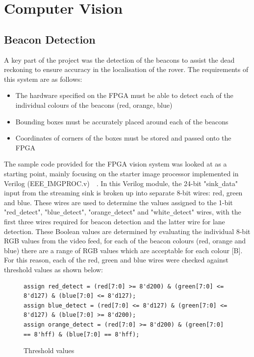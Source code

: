 \section{Computer Vision}
\subsection{Beacon Detection}
A key part of the project was the detection of the beacons to assist the dead reckoning to ensure accuracy in the localisation of the rover.
The requirements of this system are as follows:

\begin{itemize}
    \item The hardware specified on the FPGA must be able to detect each of the individual colours of the beacons (red, orange, blue)
    \item Bounding boxes must be accurately placed around each of the beacons
    \item Coordinates of corners of the boxes must be stored and passed onto the FPGA
\end{itemize}

The sample code provided for the FPGA vision system was looked at as a starting point, mainly focusing on the starter image processor implemented in Verilog (EEE\verb|_|IMGPROC.v)~\cite{ref:eebalancebug}~\cite{ref:fpga_starter}. In this Verilog module, the 24-bit "sink\verb|_|data" input from the streaming sink is broken up into separate 8-bit wires: red, green and blue. These wires are used to determine the values assigned to the 1-bit "red\verb|_|detect", "blue\verb|_|detect", "orange\verb|_|detect" and "white\verb|_|detect" wires, with the first three wires required for beacon detection and the latter wire for lane detection. These Boolean values are determined by evaluating the individual 8-bit RGB values from the video feed, for each of the beacon colours (red, orange and blue) there are a range of RGB values which are acceptable for each colour [B]. For this reason, each of the red, green and blue wires were checked against threshold values as shown below:

\begin{figure}
    \footnotesize
    \begin{verbatim}
assign red_detect = (red[7:0] >= 8'd200) & (green[7:0] <= 8'd127) & (blue[7:0] <= 8'd127);
assign blue_detect = (red[7:0] <= 8'd127) & (green[7:0] <= 8'd127) & (blue[7:0] >= 8'd200);
assign orange_detect = (red[7:0] >= 8'd200) & (green[7:0] == 8'hff) & (blue[7:0] == 8'hff);
    \end{verbatim}
    \caption{Threshold values}
    \label{code:vision1}
\end{figure}

